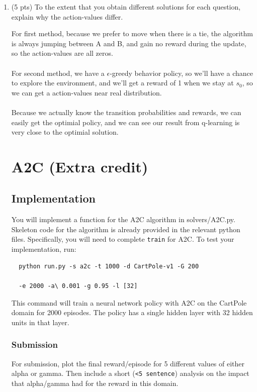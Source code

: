 \documentclass[a4paper]{article}
\theoremstyle{definition}
\newenvironment{soln}{
    \leavevmode\color{blue}\ignorespaces
}{}
\begin{document}
\begin{enumerate}
\begin{soln}
	      \end{soln}



	\item (5 pts) To the extent that you obtain different solutions for each question, explain why the action-values  differ.

	      \begin{soln}
					For first method, because we prefer to move when there is a tie, the algorithm is always jumping between A and B, and gain no reward during the update, so the action-values are all zeros.\\\\
					For second method, we have a $\epsilon$-greedy behavior policy, so we'll have a chance to explore the environment, and we'll get a reward of 1 when we stay at $s_0$, so we can get a action-values near real distribution.\\\\
					Because we actually know the transition probabilities and rewards, we can easily get the optimial policy, and we can see our result from q-learning is very close to the optimial solution.
	      \end{soln}

	      \pagebreak

	      \section{A2C (Extra credit)}
	      \subsection{Implementation}

	      You will implement a function for the A2C algorithm in solvers/A2C.py.
	      Skeleton code for the algorithm is already provided in the relevant python files.
	      Specifically, you will need to complete \verb|train| for A2C.
	      To test your implementation, run:
	      \begin{verbatim}
  python run.py -s a2c -t 1000 -d CartPole-v1 -G 200 
  
  -e 2000 -a\ 0.001 -g 0.95 -l [32]
\end{verbatim}
	      This command will train a neural network policy with A2C on the CartPole domain for 2000 episodes.
	      The policy has a single hidden layer with 32 hidden units in that layer.
	      \subsubsection*{Submission}

	      For submission, plot the final reward/episode for 5 different values of either alpha or gamma. Then include a short (\verb|<5 sentence|) analysis on the impact that alpha/gamma had for the reward in this domain.



\end{enumerate}
\end{document}
